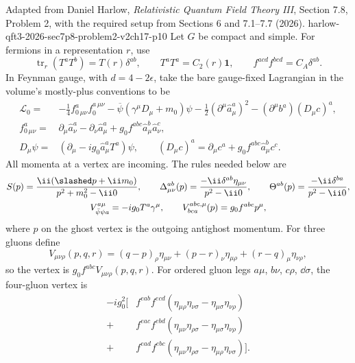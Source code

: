\begin{enumerate}
  {Adapted from Daniel Harlow, \emph{Relativistic Quantum Field Theory III},
  Section 7.8, Problem 2, with the required setup from Sections 6 and
  7.1--7.7 (2026).}
  {harlow-qft3-2026-sec7p8-problem2-v2ch17-p10}
  Let \(G\) be compact and simple.  For fermions in a representation \(r\),
  use
  \[
    \operatorname{tr}_r(T^aT^b)=T(r)\delta^{ab},\qquad
    T^aT^a=C_2(r)\mathbf1,\qquad
    f^{acd}f^{bcd}=C_A\delta^{ab}.
  \]
  In Feynman gauge, with \(d=4-2\epsilon\), take the bare gauge-fixed
  Lagrangian in the volume's mostly-plus conventions to be
  \[
  \begin{split}
    \mathcal L_0={}&-\frac14 f_{0\,\mu\nu}^af_0^{a\,\mu\nu}
      -\overline\psi(\gamma^\mu D_\mu+m_0)\psi
      -\frac12(\partial^\mu\widehat a_\mu^a)^2
      -(\partial^\mu b^a)(D_\mu c)^a,\\
    f_{0\,\mu\nu}^a={}&\partial_\mu\widehat a_\nu^a
      -\partial_\nu\widehat a_\mu^a
      +g_0f^{abc}\widehat a_\mu^b\widehat a_\nu^c,\\
    D_\mu\psi={}&(\partial_\mu-ig_0\widehat a_\mu^aT^a)\psi,
    \qquad
    (D_\mu c)^a=\partial_\mu c^a+g_0f^{abc}\widehat a_\mu^bc^c .
  \end{split}
  \]
  All momenta at a vertex are incoming.  The rules needed below are
  \[
  \begin{gathered}
    S(p)=\frac{\ii(\slashed p+\ii m_0)}{p^2+m_0^2-\ii0},\qquad
    \Delta_{\mu\nu}^{ab}(p)=\frac{-\ii\delta^{ab}\eta_{\mu\nu}}{p^2-\ii0},
    \qquad
    \Theta^{ab}(p)=\frac{-\ii\delta^{ba}}{p^2-\ii0},\\
    V_{\bar\psi\psi a}^{a\mu}=-ig_0T^a\gamma^\mu,\qquad
    V_{bca}^{abc,\mu}(p)=g_0f^{abc}p^\mu,
  \end{gathered}
  \]
  where \(p\) on the ghost vertex is the outgoing antighost momentum.  For
  three gluons define
  \[
    V_{\mu\nu\rho}(p,q,r)
      =(q-p)_\rho\eta_{\mu\nu}
       +(p-r)_\nu\eta_{\mu\rho}
       +(r-q)_\mu\eta_{\nu\rho},
  \]
  so the vertex is \(g_0f^{abc}V_{\mu\nu\rho}(p,q,r)\).  For ordered gluon
  legs \(a\mu\), \(b\nu\), \(c\rho\), \(\dd\sigma\), the four-gluon vertex is
  \[
  \begin{split}
   -ig_0^2\bigl[{}
    &f^{eab}f^{ecd}(\eta_{\mu\rho}\eta_{\nu\sigma}
                    -\eta_{\mu\sigma}\eta_{\nu\rho})\\
    +{}&f^{eac}f^{ebd}(\eta_{\mu\nu}\eta_{\rho\sigma}
                    -\eta_{\mu\sigma}\eta_{\nu\rho})\\
    +{}&f^{ead}f^{ebc}(\eta_{\mu\nu}\eta_{\rho\sigma}
                    -\eta_{\mu\rho}\eta_{\nu\sigma})\bigr].
  \end{split}
  \]


\end{enumerate}
